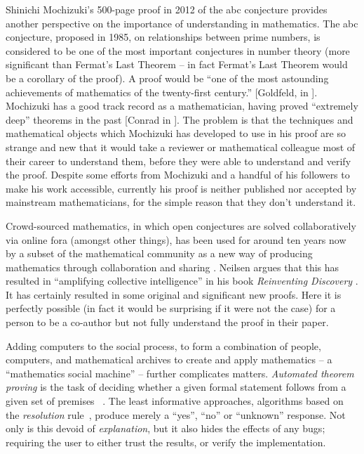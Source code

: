 \documentclass[letterpaper]{article}
\begin{document}
Shinichi Mochizuki's 500-page proof in 2012 of the abc conjecture
provides another perspective on the importance of understanding in
mathematics. The abc conjecture, proposed in 1985, on relationships
between prime numbers, is considered to be one of the most important
conjectures in number theory (more significant than Fermat’s Last
Theorem -- in fact Fermat’s Last Theorem would be a corollary of the
proof). A proof would be ``one of the most astounding achievements of
mathematics of the twenty-first century.''  [Goldfeld, in
\cite{ball:12}]. Mochizuki has a good track record as a
mathematician, having proved ``extremely deep'' theorems in the past
[Conrad in \cite{ball:12}]. The problem is that the techniques and
mathematical objects which Mochizuki has developed to use in his proof
are so strange and new that it would take a reviewer or mathematical
colleague most of their career to understand them, before they were
able to understand and verify the proof. Despite some efforts from
Mochizuki and a handful of his followers to make his work accessible,
currently his proof is neither published nor accepted by mainstream
mathematicians, for the simple reason that they don't understand
it. 


Crowd-sourced mathematics, in which open conjectures are solved
collaboratively via online fora (amongst other things), has been used
for around ten years now by a subset of the mathematical community as
a new way of producing mathematics through collaboration and sharing
\cite{massively-collaborative}. Neilsen argues that this has resulted
in ``amplifying collective intelligence'' in his book {\em Reinventing
  Discovery} \cite{nielsen}. It has certainly resulted in some
original and significant new proofs. Here it is perfectly possible (in
fact it would be surprising if it were not the case) for a person to
be a co-author but not fully understand the proof in their
paper. 

Adding computers to the social process, to form a combination of
people, computers, and mathematical archives to create and apply
mathematics -- a ``mathematics social machine'' \cite{martin:2013} --
further complicates matters. \emph{Automated theorem proving} is the
task of deciding whether a given formal statement follows from a given
set of premises ~\cite{sutcliffe2001evaluating}.  The least
informative approaches, algorithms based on the \emph{resolution}
rule~\cite{robinson1965machine}, produce merely a ``yes'', ``no'' or
``unknown'' response. Not only is this devoid of \emph{explanation},
but it also hides the effects of any bugs; requiring the user to
either trust the results, or verify the implementation.
\end{document}
